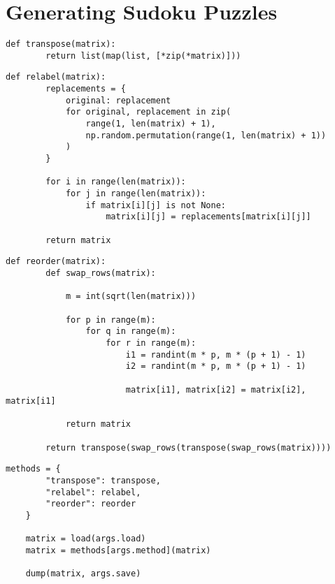 \documentclass[12pt]{article}
\begin{document}
\pagebreak

\section{Generating Sudoku Puzzles}

\begin{lstlisting}[caption={Generating a new Sudoku Puzzle by transposing the supplied one}]
    def transpose(matrix):
        return list(map(list, [*zip(*matrix)]))
\end{lstlisting}

\begin{lstlisting}[caption={Generating a new Sudoku Puzzle by relabeling the values in the supplied one}]
    def relabel(matrix):
        replacements = {
            original: replacement
            for original, replacement in zip(
                range(1, len(matrix) + 1),
                np.random.permutation(range(1, len(matrix) + 1))
            )
        }

        for i in range(len(matrix)):
            for j in range(len(matrix)):
                if matrix[i][j] is not None:
                    matrix[i][j] = replacements[matrix[i][j]]

        return matrix
\end{lstlisting}

\pagebreak

\begin{lstlisting}[caption={Generating a new Sudoku Puzzle by block reordering the rows and columns of the supplied one}]
    def reorder(matrix):
        def swap_rows(matrix):

            m = int(sqrt(len(matrix)))

            for p in range(m):
                for q in range(m):
                    for r in range(m):
                        i1 = randint(m * p, m * (p + 1) - 1)
                        i2 = randint(m * p, m * (p + 1) - 1)

                        matrix[i1], matrix[i2] = matrix[i2], matrix[i1]

            return matrix

        return transpose(swap_rows(transpose(swap_rows(matrix))))
\end{lstlisting}

\begin{lstlisting}[caption={Example Usage}]
    methods = {
        "transpose": transpose,
        "relabel": relabel,
        "reorder": reorder
    }

    matrix = load(args.load)
    matrix = methods[args.method](matrix)

    dump(matrix, args.save)
\end{lstlisting}
\end{document}
